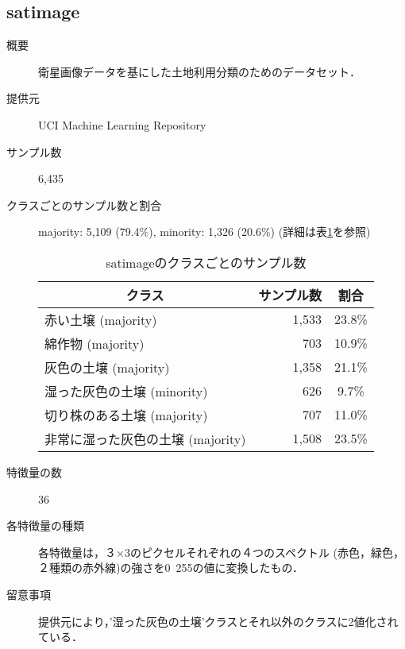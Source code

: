     \subsection{satimage}
    \begin{description}
        \item[概要] 衛星画像データを基にした土地利用分類のためのデータセット．\cite{satimage}
        \item[提供元] UCI Machine Learning Repository
        \item[サンプル数] 6,435
        \item[クラスごとのサンプル数と割合] majority: 5,109 (79.4\%), minority: 1,326 (20.6\%) (詳細は表\ref{tab:satimage}を参照)
            
            \begin{table}
                \centering
                \caption{satimageのクラスごとのサンプル数}
                \label{tab:satimage}
                \begin{tabular}{lrc} \hline
                    \multicolumn{1}{c}{クラス}&
                    \multicolumn{1}{c}{サンプル数}&
                    \multicolumn{1}{c}{割合}\\
                    \hline
                    \hline
                    赤い土壌 (majority)& 1,533 & 23.8\% \\
                    綿作物 (majority)& 703 & 10.9\% \\
                    灰色の土壌 (majority)& 1,358 & 21.1\% \\
                    湿った灰色の土壌 (minority)& 626 & 9.7\% \\
                    切り株のある土壌 (majority)& 707 & 11.0\% \\
                    非常に湿った灰色の土壌 (majority)& 1,508 & 23.5\% \\
                    \hline
                \end{tabular}
            \end{table}
        \item[特徴量の数] 36
        \item[各特徴量の種類] \mbox{}
            各特徴量は，３$\times$3のピクセルそれぞれの４つのスペクトル (赤色，緑色，２種類の赤外線)の強さを0~255の値に変換したもの．
        \item[留意事項]  提供元により，'湿った灰色の土壌'クラスとそれ以外のクラスに2値化されている．
    \end{description}


